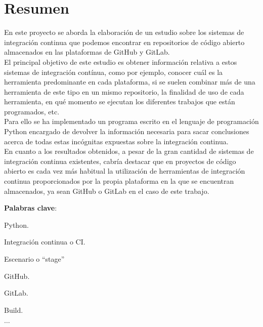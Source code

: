 \documentclass[12pt,twoside,titlepage]{report}
\newcommand\blankpage{%
    \newpage
    \null
    \thispagestyle{empty}%
    \newpage}
\begin{document}
\afterpage{\blankpage}








\chapter*{Resumen}

En este proyecto se aborda la elaboración de un estudio sobre los sistemas de integración continua que podemos encontrar en repositorios de código abierto almacenados en las plataformas de GitHub y GitLab.\\
El principal objetivo de este estudio es obtener información relativa a estos sistemas de integración contínua, como por ejemplo, conocer cuál es la herramienta predominante en cada plataforma, si se suelen combinar más de una herramienta de este tipo en un mismo repositorio, la finalidad de uso de cada herramienta, en qué momento se ejecutan los diferentes trabajos que están programados, etc.\\
Para ello se ha implementado un programa escrito en el lenguaje de programación Python encargado de devolver la información necesaria para sacar conclusiones acerca de todas estas incógnitas expuestas sobre la integración continua.\\
En cuanto a los resultados obtenidos, a pesar de la gran cantidad de sistemas de integración continua existentes, cabría destacar que en proyectos de código abierto es cada vez más habitual la utilización de herramientas de integración continua proporcionados por la propia plataforma en la que se encuentran almacenados, ya sean GitHub o GitLab en el caso de este trabajo.
\mbox{} \bigskip

\noindent \textbf{Palabras clave}:
\begin{compactitem}
    \item Python.
    \item Integración continua o CI.
    \item Escenario o ``stage''
    \item GitHub.
    \item GitLab.
    \item Build.
    \item $\ldots$
\end{compactitem}
\end{document}
